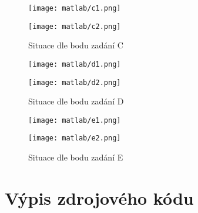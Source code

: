 \documentclass[11pt, a4paper]{article}
\begin{document}
        \begin{figure}[H]
            \centering
            \begin{minipage}{.5\textwidth}
                \centering
                \texttt{[image: matlab/c1.png]}
            \end{minipage}%
            \begin{minipage}{.5\textwidth}
                \centering
                \texttt{[image: matlab/c2.png]}
            \end{minipage}
            \caption{Situace dle bodu zadání C}
            \label{fig:3}
        \end{figure}

        \begin{figure}[H]
            \centering
            \begin{minipage}{.5\textwidth}
                \centering
                \texttt{[image: matlab/d1.png]}
            \end{minipage}%
            \begin{minipage}{.5\textwidth}
                \centering
                \texttt{[image: matlab/d2.png]}
            \end{minipage}
            \caption{Situace dle bodu zadání D}
            \label{fig:4}
        \end{figure}

        \begin{figure}[H]
            \centering
            \begin{minipage}{.5\textwidth}
                \centering
                \texttt{[image: matlab/e1.png]}
            \end{minipage}%
            \begin{minipage}{.5\textwidth}
                \centering
                \texttt{[image: matlab/e2.png]}
            \end{minipage}
            \caption{Situace dle bodu zadání E}
            \label{fig:5}
        \end{figure}

    \section{Výpis zdrojového kódu}
    
\end{document}
